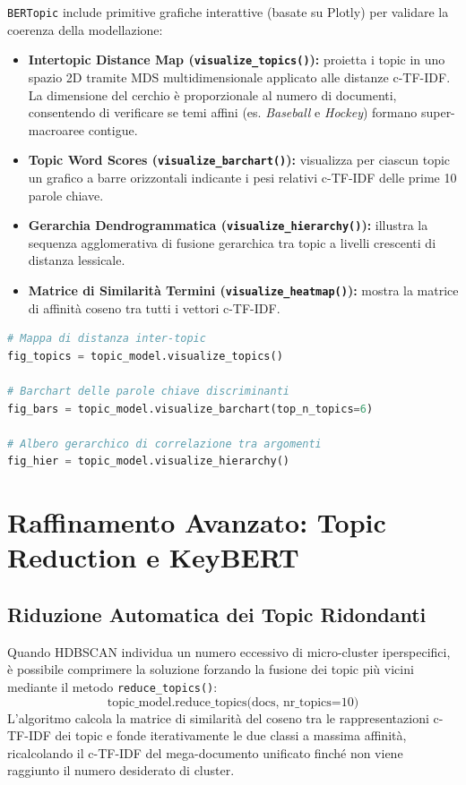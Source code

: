 \texttt{BERTopic} include primitive grafiche interattive (basate su Plotly) per validare la coerenza della modellazione:
\begin{itemize}
    \item \textbf{Intertopic Distance Map (\texttt{visualize\_topics()}):} proietta i topic in uno spazio 2D tramite MDS multidimensionale applicato alle distanze c-TF-IDF. La dimensione del cerchio è proporzionale al numero di documenti, consentendo di verificare se temi affini (es. \textit{Baseball} e \textit{Hockey}) formano super-macroaree contigue.
    \item \textbf{Topic Word Scores (\texttt{visualize\_barchart()}):} visualizza per ciascun topic un grafico a barre orizzontali indicante i pesi relativi c-TF-IDF delle prime 10 parole chiave.
    \item \textbf{Gerarchia Dendrogrammatica (\texttt{visualize\_hierarchy()}):} illustra la sequenza agglomerativa di fusione gerarchica tra topic a livelli crescenti di distanza lessicale.
    \item \textbf{Matrice di Similarità Termini (\texttt{visualize\_heatmap()}):} mostra la matrice di affinità coseno tra tutti i vettori c-TF-IDF.
\end{itemize}

\begin{lstlisting}[language=Python, caption={Generazione di diagnostiche visive con BERTopic.}]
# Mappa di distanza inter-topic
fig_topics = topic_model.visualize_topics()

# Barchart delle parole chiave discriminanti
fig_bars = topic_model.visualize_barchart(top_n_topics=6)

# Albero gerarchico di correlazione tra argomenti
fig_hier = topic_model.visualize_hierarchy()
\end{lstlisting}

\FloatBarrier
\section{Raffinamento Avanzato: Topic Reduction e KeyBERT}
\label{sec:lab-refinement}

\FloatBarrier
\subsection{Riduzione Automatica dei Topic Ridondanti}
\label{subsec:lab-topic-reduction}

Quando HDBSCAN individua un numero eccessivo di micro-cluster iperspecifici, è possibile comprimere la soluzione forzando la fusione dei topic più vicini mediante il metodo \texttt{reduce\_topics()}:
\begin{equation}
    \text{topic\_model.reduce\_topics(docs, nr\_topics=10)}
\end{equation}
L'algoritmo calcola la matrice di similarità del coseno tra le rappresentazioni c-TF-IDF dei topic e fonde iterativamente le due classi a massima affinità, ricalcolando il c-TF-IDF del mega-documento unificato finché non viene raggiunto il numero desiderato di cluster.

